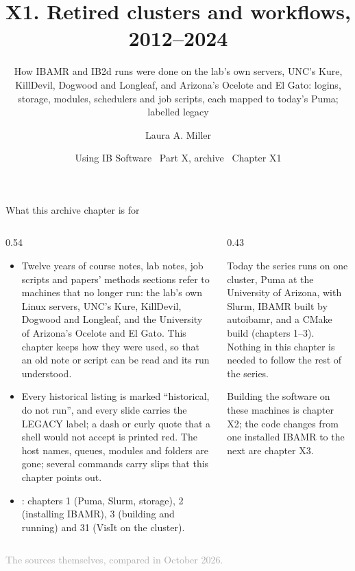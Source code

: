 \documentclass[aspectratio=169,11pt]{beamer}
\title[X1 Retired clusters and workflows]{X1. Retired clusters and workflows, 2012--2024}
\subtitle{How IBAMR and IB2d runs were done on the lab's own servers, UNC's Kure, KillDevil, Dogwood and Longleaf, and Arizona's Ocelote and El Gato: logins, storage, modules, schedulers and job scripts, each mapped to today's Puma; labelled legacy}
\author[Miller]{Laura A. Miller}
\institute[UArizona]{Department of Mathematics, University of Arizona}
\date{Using IB Software \textbullet\ Part X, archive \textbullet\ Chapter X1}
\newcommand{\sourcecredit}[1]{\vfill\begin{flushright}\tiny\textcolor{DarkGray}{#1}\end{flushright}}
\begin{document}
\begin{frame}[plain]
\end{frame}

\begin{frame}{What this archive chapter is for}
\label{fr:why}
\begin{columns}[T,onlytextwidth]
\begin{column}{0.54\textwidth}
\footnotesize
\begin{itemize}\setlength{\itemsep}{3pt}
  \item {} Twelve years of course notes, lab notes, job scripts and papers' methods sections refer to machines that no longer run: the lab's own Linux servers, UNC's Kure, KillDevil, Dogwood and Longleaf, and the University of Arizona's Ocelote and El Gato. This chapter keeps how they were used, so that an old note or script can be read and its run understood.
  \item {} Every historical listing is marked ``historical, do not run'', and every slide carries the LEGACY label; a dash or curly quote that a shell would not accept is printed red. The host names, queues, modules and folders are gone; several commands carry slips that this chapter points out.
  \item {}: chapters 1 (Puma, Slurm, storage), 2 (installing IBAMR), 3 (building and running) and 31 (VisIt on the cluster).
\end{itemize}
\end{column}
\begin{column}{0.43\textwidth}
\begin{punchbox}
\small Today the series runs on one cluster, Puma at the University of Arizona, with Slurm, IBAMR built by autoibamr, and a CMake build (chapters 1--3). Nothing in this chapter is needed to follow the rest of the series.
\end{punchbox}
\vspace{2mm}
\footnotesize Building the software on these machines is chapter X2; the code changes from one installed IBAMR to the next are chapter X3.
\end{column}
\end{columns}
\sourcecredit{The sources themselves, compared in October 2026.}
\end{frame}
\end{document}
